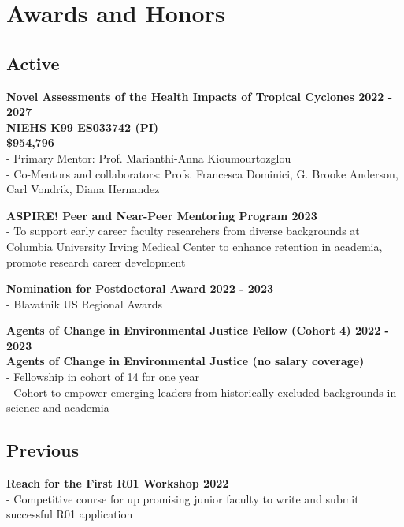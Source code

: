 \section*{Awards and Honors}

\subsection*{Active}

\noindent \textbf{Novel Assessments of the Health Impacts of Tropical Cyclones \hfill 2022 - 2027\\ 
NIEHS K99 ES033742 (PI)\\ 
\$954,796}\\
- Primary Mentor: Prof. Marianthi-Anna Kioumourtozglou\\
- Co-Mentors and collaborators: Profs. Francesca Dominici, G. Brooke Anderson, Carl Vondrik, Diana Hernandez \medskip

\noindent \textbf{ASPIRE! Peer and Near-Peer Mentoring Program  \hfill 2023} \\
- To support early career faculty researchers from diverse backgrounds at Columbia University Irving Medical Center to enhance retention in academia, promote research career development \medskip

\noindent \textbf{Nomination for Postdoctoral Award  \hfill 2022 - 2023} \\
- Blavatnik US Regional Awards
\medskip

\noindent \textbf{Agents of Change in Environmental Justice Fellow (Cohort 4) \hfill 2022 - 2023\\
Agents of Change in Environmental Justice (no salary coverage)}\\
- Fellowship in cohort of 14 for one year\\
- Cohort to empower emerging leaders from historically excluded backgrounds in science and academia 

\subsection*{Previous}

\noindent \textbf{Reach for the First R01 Workshop \hfill 2022}\\ 
- Competitive course for up promising junior faculty to write and submit successful R01 application \medskip

